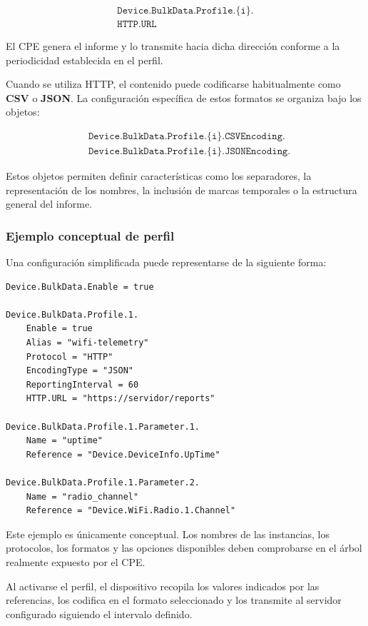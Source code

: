 \[
\begin{split}
    \texttt{Device.BulkData.Profile.\{i\}.}\\
    \texttt{HTTP.URL}
\end{split}
\]

El CPE genera el informe y lo transmite hacia dicha dirección conforme a
la periodicidad establecida en el perfil.

Cuando se utiliza HTTP, el contenido puede codificarse habitualmente como
\textbf{CSV} o \textbf{JSON}. La configuración específica de estos
formatos se organiza bajo los objetos:

\[
\begin{aligned}
    &\texttt{Device.BulkData.Profile.\{i\}.CSVEncoding.}\\
    &\texttt{Device.BulkData.Profile.\{i\}.JSONEncoding.}
\end{aligned}
\]

Estos objetos permiten definir características como los separadores, la
representación de los nombres, la inclusión de marcas temporales o la
estructura general del informe.


\subsubsection*{Ejemplo conceptual de perfil}

Una configuración simplificada puede representarse de la siguiente
forma:

\begin{verbatim}
Device.BulkData.Enable = true

Device.BulkData.Profile.1.
    Enable = true
    Alias = "wifi-telemetry"
    Protocol = "HTTP"
    EncodingType = "JSON"
    ReportingInterval = 60
    HTTP.URL = "https://servidor/reports"

Device.BulkData.Profile.1.Parameter.1.
    Name = "uptime"
    Reference = "Device.DeviceInfo.UpTime"

Device.BulkData.Profile.1.Parameter.2.
    Name = "radio_channel"
    Reference = "Device.WiFi.Radio.1.Channel"
\end{verbatim}

Este ejemplo es únicamente conceptual. Los nombres de las instancias, los
protocolos, los formatos y las opciones disponibles deben comprobarse en
el árbol realmente expuesto por el CPE.

Al activarse el perfil, el dispositivo recopila los valores indicados por
las referencias, los codifica en el formato seleccionado y los transmite
al servidor configurado siguiendo el intervalo definido.


